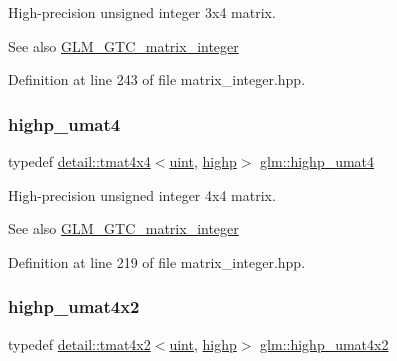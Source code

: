 High-\/precision unsigned integer 3x4 matrix. \begin{DoxySeeAlso}{See also}
\hyperlink{group__gtc__matrix__integer}{G\+L\+M\+\_\+\+G\+T\+C\+\_\+matrix\+\_\+integer} 
\end{DoxySeeAlso}


Definition at line 243 of file matrix\+\_\+integer.\+hpp.

\mbox{\label{group__gtc__matrix__integer_gaf12f0d2744e809e64469d27ef392aa98}} 
\subsubsection{\texorpdfstring{highp\+\_\+umat4}{highp\_umat4}}
{\footnotesize\ttfamily typedef \hyperlink{structglm_1_1detail_1_1tmat4x4}{detail\+::tmat4x4}$<$\hyperlink{group__core__precision_ga4fd29415871152bfb5abd588334147c8}{uint}, \hyperlink{namespaceglm_a0f04f086094c747d227af4425893f545ac6f7eab42eacbb10d59a58e95e362074}{highp}$>$ \hyperlink{group__gtc__matrix__integer_gaf12f0d2744e809e64469d27ef392aa98}{glm\+::highp\+\_\+umat4}}

High-\/precision unsigned integer 4x4 matrix. \begin{DoxySeeAlso}{See also}
\hyperlink{group__gtc__matrix__integer}{G\+L\+M\+\_\+\+G\+T\+C\+\_\+matrix\+\_\+integer} 
\end{DoxySeeAlso}


Definition at line 219 of file matrix\+\_\+integer.\+hpp.

\mbox{\label{group__gtc__matrix__integer_ga32442efcb778cb80024a17bafa781f81}} 
\subsubsection{\texorpdfstring{highp\+\_\+umat4x2}{highp\_umat4x2}}
{\footnotesize\ttfamily typedef \hyperlink{structglm_1_1detail_1_1tmat4x2}{detail\+::tmat4x2}$<$\hyperlink{group__core__precision_ga4fd29415871152bfb5abd588334147c8}{uint}, \hyperlink{namespaceglm_a0f04f086094c747d227af4425893f545ac6f7eab42eacbb10d59a58e95e362074}{highp}$>$ \hyperlink{group__gtc__matrix__integer_ga32442efcb778cb80024a17bafa781f81}{glm\+::highp\+\_\+umat4x2}}

